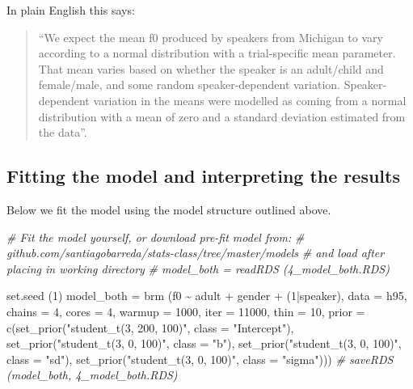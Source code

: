 \documentclass[
]{book}
\newenvironment{Shaded}{\begin{snugshade}}{\end{snugshade}}
\newcommand{\AttributeTok}[1]{\textcolor[rgb]{0.77,0.63,0.00}{#1}}
\newcommand{\CommentTok}[1]{\textcolor[rgb]{0.56,0.35,0.01}{\textit{#1}}}
\newcommand{\DecValTok}[1]{\textcolor[rgb]{0.00,0.00,0.81}{#1}}
\newcommand{\FunctionTok}[1]{\textcolor[rgb]{0.00,0.00,0.00}{#1}}
\newcommand{\NormalTok}[1]{#1}
\newcommand{\OtherTok}[1]{\textcolor[rgb]{0.56,0.35,0.01}{#1}}
\newcommand{\SpecialCharTok}[1]{\textcolor[rgb]{0.00,0.00,0.00}{#1}}
\newcommand{\StringTok}[1]{\textcolor[rgb]{0.31,0.60,0.02}{#1}}
\begin{document}
In plain English this says:

\begin{quote}
``We expect the mean f0 produced by speakers from Michigan to vary according to a normal distribution with a trial-specific mean parameter. That mean varies based on whether the speaker is an adult/child and female/male, and some random speaker-dependent variation. Speaker-dependent variation in the means were modelled as coming from a normal distribution with a mean of zero and a standard deviation estimated from the data''.
\end{quote}

\hypertarget{fitting-the-model-and-interpreting-the-results}{%
\subsection{Fitting the model and interpreting the results}\label{fitting-the-model-and-interpreting-the-results}}

Below we fit the model using the model structure outlined above.

\begin{Shaded}
\begin{Highlighting}[]
\CommentTok{\# Fit the model yourself, or download pre{-}fit model from: }
\CommentTok{\# github.com/santiagobarreda/stats{-}class/tree/master/models}
\CommentTok{\# and load after placing in working directory}
\CommentTok{\#  model\_both = readRDS (\textquotesingle{}4\_model\_both.RDS\textquotesingle{})}

\FunctionTok{set.seed}\NormalTok{ (}\DecValTok{1}\NormalTok{)}
\NormalTok{model\_both }\OtherTok{=}  
  \FunctionTok{brm}\NormalTok{ (f0 }\SpecialCharTok{\textasciitilde{}}\NormalTok{ adult }\SpecialCharTok{+}\NormalTok{ gender }\SpecialCharTok{+}\NormalTok{ (}\DecValTok{1}\SpecialCharTok{|}\NormalTok{speaker), }\AttributeTok{data =}\NormalTok{ h95, }\AttributeTok{chains =} \DecValTok{4}\NormalTok{, }\AttributeTok{cores =} \DecValTok{4}\NormalTok{, }
       \AttributeTok{warmup =} \DecValTok{1000}\NormalTok{, }\AttributeTok{iter =} \DecValTok{11000}\NormalTok{, }\AttributeTok{thin =} \DecValTok{10}\NormalTok{, }
       \AttributeTok{prior =} \FunctionTok{c}\NormalTok{(}\FunctionTok{set\_prior}\NormalTok{(}\StringTok{"student\_t(3, 200, 100)"}\NormalTok{, }\AttributeTok{class =} \StringTok{"Intercept"}\NormalTok{),}
                              \FunctionTok{set\_prior}\NormalTok{(}\StringTok{"student\_t(3, 0, 100)"}\NormalTok{, }\AttributeTok{class =} \StringTok{"b"}\NormalTok{),}
                              \FunctionTok{set\_prior}\NormalTok{(}\StringTok{"student\_t(3, 0, 100)"}\NormalTok{, }\AttributeTok{class =} \StringTok{"sd"}\NormalTok{),}
                              \FunctionTok{set\_prior}\NormalTok{(}\StringTok{"student\_t(3, 0, 100)"}\NormalTok{, }\AttributeTok{class =} \StringTok{"sigma"}\NormalTok{))) }
\CommentTok{\#  saveRDS (model\_both, \textquotesingle{}4\_model\_both.RDS\textquotesingle{})}
\end{Highlighting}
\end{Shaded}
\end{document}
